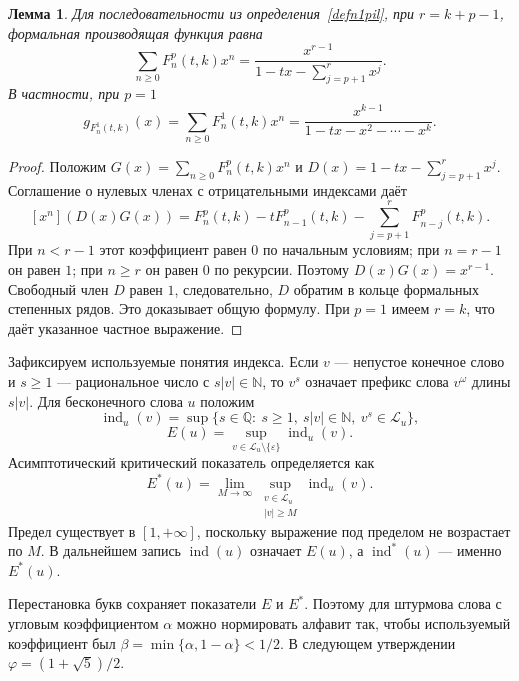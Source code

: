 \documentclass[a4paper,14pt]{extreport}
\theoremstyle{plain}
\newtheorem{lemma}{Лемма}[section]
\theoremstyle{definition}
\theoremstyle{remark}
\begin{document}
\begin{lemma}\label{lemgenn1}
Для последовательности из определения~\ref{defn1pil}, при $r=k+p-1$,
формальная производящая функция равна
\[
 \sum_{n\ge0}F_n^p(t,k)x^n
 =\frac{x^{r-1}}{1-tx-\sum_{j=p+1}^{r}x^j}.
\]
В частности, при $p=1$
\begin{equation}
 g_{F_n^1(t,k)}(x)
 =\sum_{n\ge0}F_n^1(t,k)x^n
 =\frac{x^{k-1}}{1-tx-x^2-\cdots-x^k}.
\end{equation}
\end{lemma}
\begin{proof}
Положим $G(x)=\sum_{n\ge0}F_n^p(t,k)x^n$ и
$D(x)=1-tx-\sum_{j=p+1}^{r}x^j$.
Соглашение о нулевых членах с отрицательными индексами даёт
\[
 [x^n](D(x)G(x))
 =F_n^p(t,k)-tF_{n-1}^p(t,k)
       -\sum_{j=p+1}^{r}F_{n-j}^p(t,k).
\]
При $n<r-1$ этот коэффициент равен $0$ по начальным условиям;
при $n=r-1$ он равен $1$; при $n\ge r$ он равен $0$
по рекурсии. Поэтому $D(x)G(x)=x^{r-1}$.
Свободный член $D$ равен $1$, следовательно, $D$ обратим
в кольце формальных степенных рядов. Это доказывает общую формулу.
При $p=1$ имеем $r=k$, что даёт указанное частное выражение.
\end{proof}

Зафиксируем используемые понятия индекса. Если $v$ --- непустое
конечное слово и $s\ge1$ --- рациональное число с $s|v|\in\mathbb N$,
то $v^s$ означает префикс слова $v^\omega$ длины $s|v|$.
Для бесконечного слова $u$ положим
\[
 \operatorname{ind}_u(v)
 =\sup\{s\in\mathbb Q:\ s\ge1,\ s|v|\in\mathbb N,\ v^s\in\mathcal L_u\},
 \]
 \[
 E(u)=\sup_{v\in\mathcal L_u\setminus\{\varepsilon\}}\operatorname{ind}_u(v).
\]
Асимптотический критический показатель определяется как
\[
 E^*(u)=\lim_{M\to\infty}
 \sup_{\substack{v\in\mathcal L_u\\ |v|\ge M}}\operatorname{ind}_u(v).
\]
Предел существует в $[1,+\infty]$, поскольку выражение под
пределом не возрастает по $M$. В дальнейшем запись
$\operatorname{ind}(u)$ означает $E(u)$, а
$\operatorname{ind}^*(u)$ --- именно $E^*(u)$.

Перестановка букв сохраняет показатели $E$ и $E^*$.
Поэтому для штурмова слова с угловым коэффициентом $\alpha$
можно нормировать алфавит так, чтобы используемый коэффициент
был $\beta=\min\{\alpha,1-\alpha\}<1/2$.
В следующем утверждении $\varphi=(1+\sqrt5)/2$.
\end{document}
